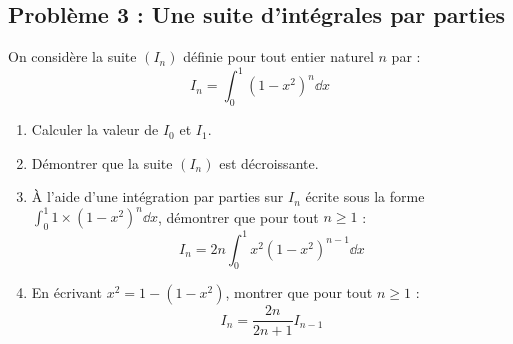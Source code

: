 \subsection*{Problème 3 : Une suite d'intégrales par parties}
On considère la suite $(I_n)$ définie pour tout entier naturel $n$ par :
\[
I_n = \int_0^1 (1 - x^2)^n \dd x
\]
\begin{enumerate}
    \item Calculer la valeur de $I_0$ et $I_1$.
    \item Démontrer que la suite $(I_n)$ est décroissante.
    \item À l'aide d'une intégration par parties sur $I_n$ écrite sous la forme $\int_0^1 1 \times (1-x^2)^n \dd x$, démontrer que pour tout $n \ge 1$ :
    \[
    I_n = 2n \int_0^1 x^2 (1 - x^2)^{n-1} \dd x
    \]
    \item En écrivant $x^2 = 1 - (1 - x^2)$, montrer que pour tout $n \ge 1$ :
    \[
    I_n = \frac{2n}{2n + 1} I_{n-1}
    \]
\end{enumerate}

